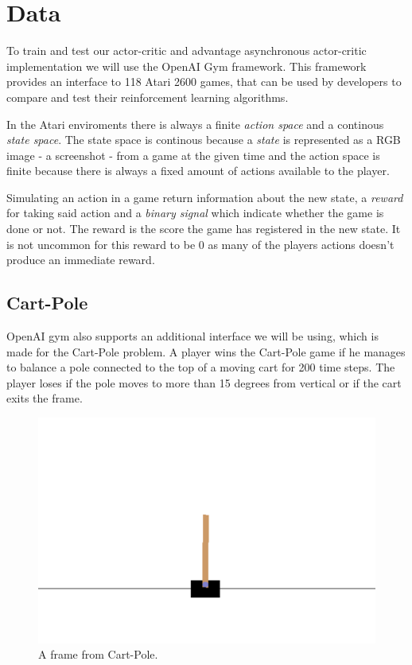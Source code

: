 \documentclass[11pt]{article}
\begin{document}
\maketitle

\section{Data}\label{Data}

To train and test our actor-critic and advantage asynchronous actor-critic implementation we will use
the OpenAI Gym framework\cite{openAIGym}.
This framework provides an interface to 118 Atari 2600 games,
that can be used by developers to compare and test their reinforcement learning algorithms.

 
In the Atari enviroments there is always a finite \textit{action space} and a continous \textit{state space}.
The state space is continous because a \textit{state} is represented as a RGB image - a screenshot - from a game
at the given time and the action space is finite because there is always a fixed amount of
actions available to the player.

Simulating an action in a game return information about the new state,
a \textit{reward} for taking said action and a \textit{binary signal} which indicate whether the 
game is done or not.
The reward is the score the game has registered in the new state.
It is not uncommon for this reward to be $0$ as many of the players actions doesn't produce an immediate reward.

\subsection{Cart-Pole}

OpenAI gym also supports an additional interface we will be using, which is made for the Cart-Pole problem.
A player wins the Cart-Pole game if he manages to balance a pole connected to the top of a moving cart for
200 time steps.
The player loses if the pole moves to more than 15 degrees from vertical
or if the cart exits the frame.

\begin{figure}[!h]
    \centering
    \includegraphics[scale=0.5]{include/cartpole.png}
    \caption{A frame from Cart-Pole.}
    \label{fig:cartpole}
\end{figure}
\end{document}
